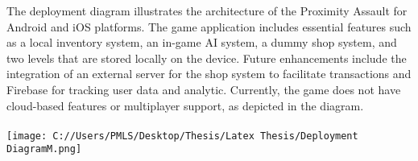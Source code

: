The deployment diagram illustrates the architecture of the Proximity Assault for Android and iOS platforms. The game application includes essential features such as a local inventory system, an in-game AI system, a dummy shop system, and two levels that are stored locally on the device. Future enhancements include the integration of an external server for the shop system to facilitate transactions and Firebase for tracking user data and analytic. Currently, the game does not have cloud-based features or multiplayer support, as depicted in the diagram.\\
\\
\texttt{[image: C://Users/PMLS/Desktop/Thesis/Latex Thesis/Deployment DiagramM.png]}